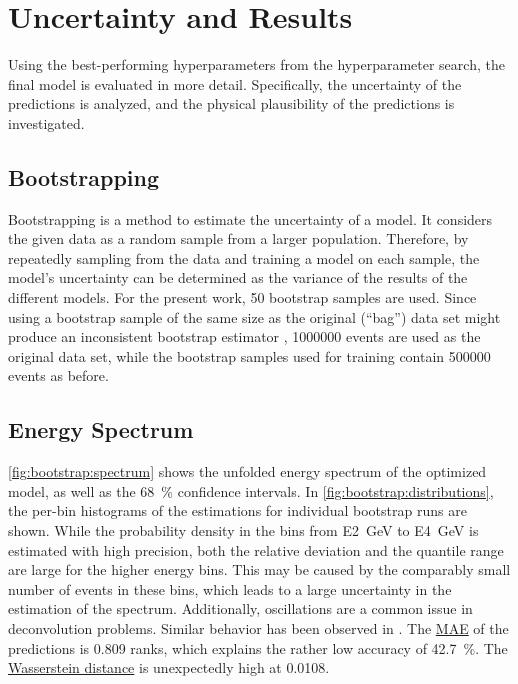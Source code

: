 \section{Uncertainty and Results}
Using the best-performing hyperparameters from the hyperparameter search, %
the final model is evaluated in more detail.
Specifically,
  the uncertainty of the predictions is analyzed, %
  and the physical plausibility of the predictions is investigated.


\subsection{Bootstrapping}
Bootstrapping \cite{bootstrap} is a method to estimate the uncertainty of a model.
It considers the given data as a random sample from a larger population.
Therefore,
by repeatedly sampling from the data and training a model on each sample,
the model's uncertainty can be determined
as the variance of the results of the different models.
%
For the present work, \num{50} bootstrap samples are used.
Since using a bootstrap sample of the same size as the original (\enquote{bag}) data set
might produce an inconsistent bootstrap estimator \cite{bootstrap_samplesize},
\num{1000000} events are used as the original data set,
while the bootstrap samples used for training contain \num{500000} events as before.


\subsection{Energy Spectrum}
\autoref{fig:bootstrap:spectrum} shows the unfolded energy spectrum of the optimized model,
as well as the \SI{68}{\percent} confidence intervals.
In \autoref{fig:bootstrap:distributions},
the per-bin histograms of the estimations for individual bootstrap runs are shown.
While the probability density in the bins from \SI{E2}{\giga\electronvolt} to \SI{E4}{\giga\electronvolt} is estimated with high precision,
both the relative deviation and the quantile range are large for the higher energy bins.
This may be caused by the comparably small number of events in these bins,
which leads to a large uncertainty in the estimation of the spectrum.
Additionally,
oscillations are a common issue in deconvolution problems.
Similar behavior has been observed in \cite{dsea_samuel}.
%
The \hyperref[sec:unfolding:metrics:mae]{\ac{MAE}} of the predictions is \num{0.809} ranks,
  which explains the rather low accuracy of \SI{42.7}{\percent}.
The \hyperref[sec:unfolding:metrics:wasserstein]{Wasserstein distance}
is unexpectedly high at \num{0.0108}.

